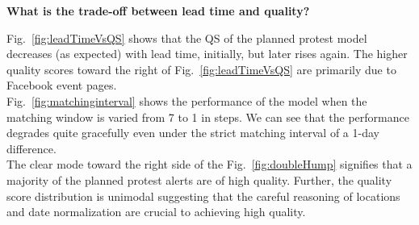\documentclass[letterpaper]{article}
\begin{document}
\noindent
{\bf What is the trade-off between lead time and quality?}

Fig.~\ref{fig:leadTimeVsQS} shows that the QS of the planned protest
model decreases (as expected) with lead time, initially, but later rises
again. The higher quality scores toward the right of
Fig.~\ref{fig:leadTimeVsQS} are primarily due to Facebook event pages.\\

 Fig.~\ref{fig:matchinginterval} shows the performance of the
model when the matching window is varied from 7 to 1 in steps.  We can
see that the performance degrades quite gracefully even under the strict
matching interval of a 1-day difference.\\

 The clear
mode toward the right side of the Fig.~\ref{fig:doubleHump} signifies
that a majority of the planned protest alerts are of high quality.
Further, the quality score distribution is unimodal suggesting that the
careful reasoning of locations and date normalization are crucial to
achieving high quality.
\end{document}
